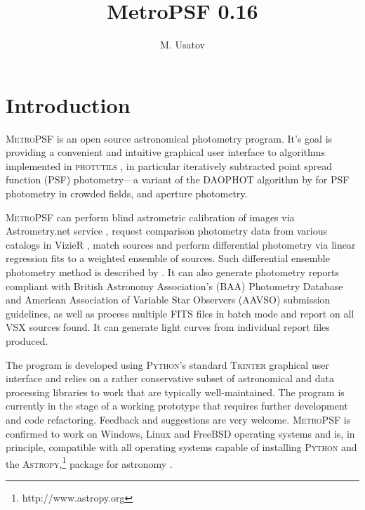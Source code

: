 \documentclass{article}
\begin{document}
\title{MetroPSF 0.16}
\author{M. Usatov}

\maketitle

\tableofcontents

\section{Introduction} \label{intro}
\textsc{MetroPSF} is an open source astronomical photometry program. It's goal is providing a convenient and intuitive graphical user interface to algorithms implemented in \textsc{photutils} \citep{larry_bradley_2020_4044744}, in particular iteratively subtracted point spread function (PSF) photometry---a variant of the \textsc{DAOPHOT} algorithm by \citet{1987PASP...99..191S} for PSF photometry in crowded fields, and aperture photometry. 

\textsc{MetroPSF} can perform blind astrometric calibration of images via Astrometry.net service \citep{2010AJ....139.1782L}, request comparison photometry data from various catalogs in VizieR \citep{2000A&AS..143...23O}, match sources and perform differential photometry via linear regression fits to a weighted ensemble of sources. Such differential ensemble photometry method is described by \citet{2010JAVSO..38..202P}. It can also generate photometry reports compliant with British Astronomy Association's (BAA) Photometry Database and American Association of Variable Star Observers (AAVSO) submission guidelines, as well as process multiple FITS files in batch mode and report on all VSX sources found. It can generate light curves from individual report files produced. 

The program is developed using \textsc{Python}'s standard \textsc{Tkinter} graphical user interface and relies on a rather conservative subset of astronomical and data processing libraries to work that are typically well-maintained. The program is currently in the stage of a working prototype that requires further development and code refactoring. Feedback and suggestions are very welcome. \textsc{MetroPSF} is confirmed to work on Windows, Linux and FreeBSD operating systems and is, in principle, compatible with all operating systems capable of installing \textsc{Python} and the \textsc{Astropy},\footnote{http://www.astropy.org} package for astronomy \citep{astropy:2013, astropy:2018}. 
\end{document}

